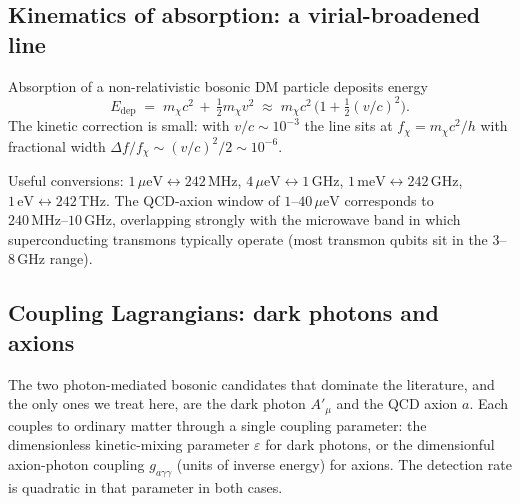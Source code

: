 \subsection{Kinematics of absorption: a virial-broadened line}
\label{sec:absorption-kinematics}

\begin{statement}
\label{stmt:line}
Absorption of a non-relativistic bosonic DM particle deposits
energy
\begin{equation}
\label{eq:E-deposited}
E_\text{dep} \;=\; m_\chi c^2 \,+\, \tfrac12 m_\chi v^2
\;\approx\; m_\chi c^2\,\bigl(1+\tfrac{1}{2}(v/c)^2\bigr).
\end{equation}
The kinetic correction is small: with $v/c\sim 10^{-3}$ the line
sits at $f_\chi=m_\chi c^2/h$ with fractional width
$\Delta f/f_\chi \sim (v/c)^2/2 \sim 10^{-6}$.
\end{statement}

\begin{example}
\label{ex:freq-mass}
Useful conversions:
$1\,\mu\text{eV}\leftrightarrow 242\,\text{MHz}$,
$4\,\mu\text{eV}\leftrightarrow 1\,\text{GHz}$,
$1\,\text{meV}\leftrightarrow 242\,\text{GHz}$,
$1\,\text{eV}\leftrightarrow 242\,\text{THz}$. The QCD-axion
window of $1\text{--}40\,\mu\text{eV}$ corresponds to
$240\,\text{MHz}\text{--}10\,\text{GHz}$, overlapping strongly
with the microwave band in which superconducting transmons
typically operate (most transmon qubits sit in the $3$--$8\,\text{GHz}$
range).
\end{example}

\subsection{Coupling Lagrangians: dark photons and axions}
\label{sec:absorption-couplings}

The two photon-mediated bosonic candidates that dominate the
literature, and the only ones we treat here, are the dark photon
$A'_\mu$ and the QCD axion $a$. Each couples to ordinary matter
through a single coupling parameter: the dimensionless
kinetic-mixing parameter $\varepsilon$ for dark photons, or the
dimensionful axion-photon coupling $g_{a\gamma\gamma}$ (units of
inverse energy) for axions. The detection rate is quadratic in
that parameter in both cases.

